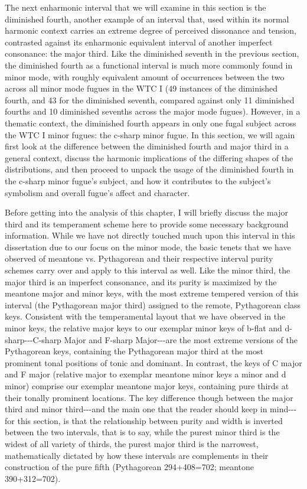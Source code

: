 The next enharmonic interval that we will examine in this section is the
diminished fourth, another example of an interval that, used within its
normal harmonic context carries an extreme degree of perceived
dissonance and tension, contrasted against its enharmonic equivalent
interval of another imperfect consonance: the major third. Like the
diminished seventh in the previous section, the diminished fourth as a
functional interval is much more commonly found in minor mode, with
roughly equivalent amount of occurrences between the two across all
minor mode fugues in the WTC I (49 instances of the diminished fourth,
and 43 for the diminished seventh, compared against only 11 diminished
fourths and 10 diminished sevenths across the major mode fugues).
However, in a thematic context, the diminished fourth appears in only
one fugal subject across the WTC I minor fugues: the c-sharp minor
fugue. In this section, we will again first look at the difference
between the diminished fourth and major third in a general context,
discuss the harmonic implications of the differing shapes of the
distributions, and then proceed to unpack the usage of the diminished
fourth in the c-sharp minor fugue's subject, and how it contributes to
the subject's symbolism and overall fugue's affect and character.

Before getting into the analysis of this chapter, I will briefly discuss
the major third and its temperament scheme here to provide some
necessary background information. While we have not directly touched
much upon this interval in this dissertation due to our focus on the
minor mode, the basic tenets that we have observed of meantone vs.
Pythagorean and their respective interval purity schemes carry over and
apply to this interval as well. Like the minor third, the major third is
an imperfect consonance, and its purity is maximized by the meantone
major and minor keys, with the most extreme tempered version of this
interval (the Pythagorean major third) assigned to the remote,
Pythagorean class keys. Consistent with the temperamental layout that we
have observed in the minor keys, the relative major keys to our exemplar
minor keys of b-flat and d-sharp-\/-\/-C-sharp Major and F-sharp
Major-\/-\/-are the most extreme versions of the Pythagorean keys,
containing the Pythagorean major third at the most prominent tonal
positions of tonic and dominant. In contrast, the keys of C major and F
major (relative major to exemplar meantone minor keys a minor and d
minor) comprise our exemplar meantone major keys, containing pure thirds
at their tonally prominent locations. The key difference though between
the major third and minor third-\/-\/-and the main one that the reader
should keep in mind-\/-\/-for this section, is that the relationship
between purity and width is inverted between the two intervals, that is
to say, while the purest minor third is the widest of all variety of
thirds, the purest major third is the narrowest, mathematically dictated
by how these intervals are complements in their construction of the pure
fifth (Pythagorean 294+408=702; meantone 390+312=702).

